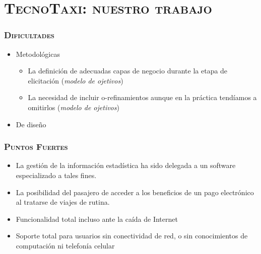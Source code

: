 
\begin{frame}[t,plain]
\titlepage
\end{frame}

\watermarkoff

\section{\textsc{TecnoTaxi: nuestro trabajo}}


\begin{frame}
\frametitle{\textsc{Dificultades}}
\begin{itemize}
\item Metodológicas
\begin{itemize}
\item La definición de adecuadas capas de negocio durante la etapa de elicitación (\emph{modelo de ojetivos})
\item La necesidad de incluir o-refinamientos aunque en la práctica tendíamos a omitirlos (\emph{modelo de ojetivos})
\end{itemize}
\item De diseño
\end{itemize}
\end{frame}


\begin{frame}
\frametitle{\textsc{Puntos Fuertes}}

\begin{itemize}
\item La gestión de la información estadística ha sido delegada a un software especializado a tales fines. 
\item La posibilidad del pasajero de acceder a los beneficios de un pago electrónico al tratarse de viajes de rutina.
\item Funcionalidad total incluso ante la ca\'ida de Internet
\item Soporte total para usuarios sin conectividad de red, o sin conocimientos de computaci\'on ni telefon\'ia celular
\end{itemize}
\end{frame}

